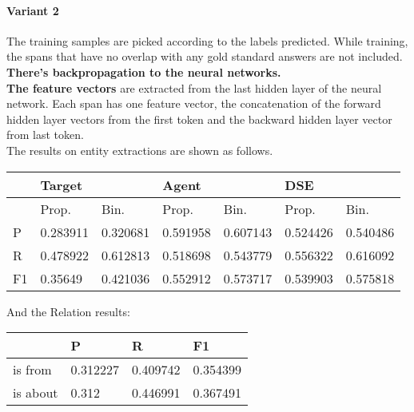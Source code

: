 \documentclass[a4paper, 12pt]{article}
\begin{document}
\paragraph{Variant 2}
The training samples are picked according to the labels predicted. While
training, the spans that have no overlap with any gold standard answers
are not included. \textbf{There's backpropagation to the neural networks.} \\
\textbf{The feature vectors} are extracted from the last hidden layer of the neural
network. Each span has one feature vector, the concatenation of the forward hidden
layer vectors from the first token and the backward hidden layer vector from last token.\\
The results on entity extractions are shown as follows.\\
\begin{table}[h!]
\centering
\begin{tabular}{l|ll|ll|ll}
\hline
   & \multicolumn{2}{l}{Target} & \multicolumn{2}{l}{Agent} & \multicolumn{2}{l}{DSE} \\ \hline
   & Prop.& Bin.& Prop.& Bin.& Prop.& Bin.\\
 \hline
P  &0.283911&0.320681 &0.591958 & 0.607143 &0.524426 & 0.540486 \\
R  &0.478922&0.612813 &0.518698 & 0.543779 &0.556322 & 0.616092 \\
F1 & 0.35649&0.421036 &0.552912 & 0.573717 &0.539903 & 0.575818 \\ \hline 
\end{tabular}
\end{table}
And the Relation results:
\begin{table}[h!]
\centering
\begin{tabular}{l|l|l|l}
\hline
         & P & R & F1    \\\hline
is from  & 0.312227& 0.409742& 0.354399 \\
is about & 0.312& 0.446991& 0.367491 \\
\hline
\end{tabular}
\end{table}
\end{document}
